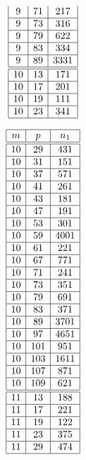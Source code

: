 \documentclass[a4paper, 10pt]{article}
\begin{document}
\begin{center}
\begin{minipage}[t]{.23\textwidth}
\begin{displaymath}
\begin{array}{|c|c|c|}
9 & 71 & 217 \\ \hline
9 & 73 & 316 \\ \hline
9 & 79 & 622 \\ \hline
9 & 83 & 334 \\ \hline
9 & 89 & 3331 \\ \hline
\hline
10 & 13 & 171 \\ \hline
10 & 17 & 201 \\ \hline
10 & 19 & 111 \\ \hline
10 & 23 & 341 \\ \hline
\end{array}
\end{displaymath}
\end{minipage}
\begin{minipage}[t]{.23\textwidth}
\begin{displaymath}
\begin{array}{|c|c|c|}
\hline
m & p & n_{1} \\ \hline
\hline
10 & 29 & 431 \\ \hline
10 & 31 & 151 \\ \hline
10 & 37 & 571 \\ \hline
10 & 41 & 261 \\ \hline
10 & 43 & 181 \\ \hline
10 & 47 & 191 \\ \hline
10 & 53 & 301 \\ \hline
10 & 59 & 4001 \\ \hline
10 & 61 & 221 \\ \hline
10 & 67 & 771 \\ \hline
10 & 71 & 241 \\ \hline
10 & 73 & 351 \\ \hline
10 & 79 & 691 \\ \hline
10 & 83 & 371 \\ \hline
10 & 89 & 3701 \\ \hline
10 & 97 & 4651 \\ \hline
10 & 101 & 951 \\ \hline
10 & 103 & 1611 \\ \hline
10 & 107 & 871 \\ \hline
10 & 109 & 621 \\ \hline
\hline
11 & 13 & 188 \\ \hline
11 & 17 & 221 \\ \hline
11 & 19 & 122 \\ \hline
11 & 23 & 375 \\ \hline
11 & 29 & 474 \\ \hline

\end{array}
\end{displaymath}
\end{minipage}
\end{center}
\end{document}
